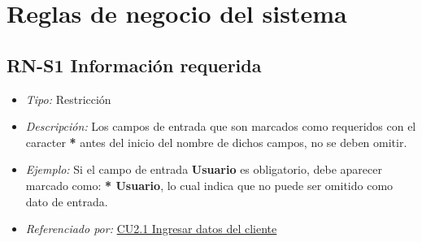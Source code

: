 

\section{Reglas de negocio del sistema}

	\hypertarget{RN:S1:InfoRequerida}{}
	\subsection{RN-S1 Información requerida}
		
		\begin{itemize}

			\item \textit{Tipo:} Restricción

			\item \textit{Descripción:} Los campos de entrada que son marcados como requeridos con el caracter \textbf{*} antes del inicio del nombre de dichos campos, no se deben omitir.

			\item \textit{Ejemplo:} Si el campo de entrada \textbf{Usuario} es obligatorio, debe aparecer marcado como: \textbf{* Usuario}, lo cual indica que no puede ser omitido como dato de entrada.

			\item \textit{Referenciado por:} \hyperlink{CU2.1}{CU2.1 Ingresar datos del cliente}

		\end{itemize}

